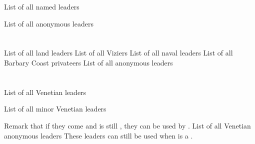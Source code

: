 \aparag List of all named leaders 

\aparag List of all anonymous leaders \listanonymesuedeM




\section{\paysmajeurTurquie}

\aparag List of all land leaders 
\aparag List of all Viziers 
\aparag List of all naval leaders 
\aparag List of all Barbary Coast privateers 
\aparag List of all anonymous leaders \listanonymeturquie




\section{\paysmajeurVenise}

\aparag List of all Venetian leaders 

\aparag List of all minor Venetian leaders 

\bparag Remark that if they come and \paysVenise is still \MAJ, they can be
used by \VEN.
\aparag List of all Venetian anonymous leaders
\bparag These leaders can still be used when \paysVenise is a \MIN.
\listanonymevenise


